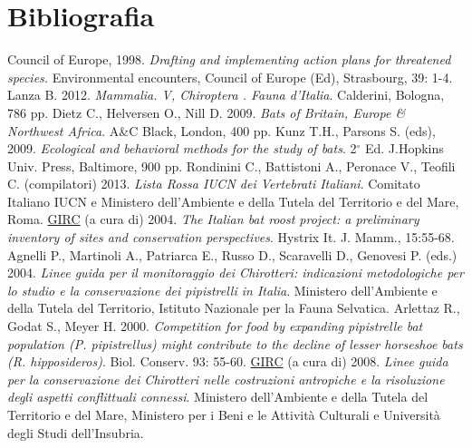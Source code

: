 \documentclass[10pt,twoside,openany,x11names,svgnames,italian,a5paper,dvipsnames,table]{memoir}
\newcommand\chapterillustration{}
\begin{document}
\chapter{Bibliografia}
\renewcommand\chapterillustration{}
\renewcommand*{\bibname}{}
\begingroup
\renewcommand{\addcontentsline}[3]{}%
\renewcommand{\section}[2]{}%
\begin{thebibliography}{99}
\footnotesize
{} Council of Europe, 1998. \emph{Drafting and implementing action plans for threatened species.} Environmental encounters, Council of Europe (Ed), Strasbourg, 39: 1-4.
 Lanza B. 2012. \emph{Mammalia. V, Chiroptera . Fauna d’Italia}. Calderini, Bologna, 786 pp.
 Dietz C., Helversen O., Nill D. 2009. \emph{Bats of Britain, Europe \& Northwest Africa}. A\&C Black, London, 400 pp.
 Kunz T.H., Parsons S. (eds), 2009. \emph{Ecological and behavioral methods for the study of bats}. 2$^\circ$ Ed. J.Hopkins Univ. Press, Baltimore, 900 pp.
 Rondinini C., Battistoni A., Peronace V., Teofili C. (compilatori) 2013. \emph{Lista Rossa IUCN dei Vertebrati Italiani}. Comitato Italiano IUCN e Ministero dell’Ambiente e della Tutela del Territorio e del Mare, Roma.
 \href{http://www.pipistrelli.net/}{GIRC} (a cura di) 2004. \emph{The Italian bat roost project: a preliminary inventory of sites and conservation perspectives}. Hystrix It. J. Mamm., 15:55-68.
 Agnelli P., Martinoli A., Patriarca E., Russo D., Scaravelli D., Genovesi P. (eds.) 2004. \emph{Linee guida per il monitoraggio dei Chirotteri: indicazioni metodologiche per lo studio e la conservazione dei pipistrelli in Italia}. Ministero dell’Ambiente e della Tutela del Territorio, Istituto Nazionale per la Fauna Selvatica.
 Arlettaz R., Godat S., Meyer H. 2000. \emph{Competition for food by expanding pipistrelle bat population (P. pipistrellus) might contribute to the decline of lesser horseshoe bats (R. hipposideros)}. Biol. Conserv. 93: 55-60.
 \href{http://www.pipistrelli.net/}{GIRC} (a cura di) 2008. \emph{Linee guida per la conservazione dei Chirotteri nelle costruzioni antropiche e la risoluzione degli aspetti conflittuali connessi}. Ministero dell’Ambiente e della Tutela del Territorio e del Mare, Ministero per i Beni e le Attività Culturali e Università degli Studi dell’Insubria.

\end{thebibliography}
\end{document}
